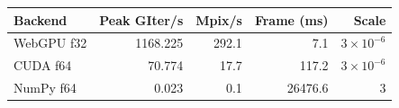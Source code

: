 \begin{tabular}{@{}lrrrr@{}}
\toprule
Backend & Peak GIter/s & Mpix/s & Frame (ms) & Scale \\
\midrule
WebGPU f32 & 1168.225 & 292.1 & 7.1 & $3{\times}10^{-6}$ \\
CUDA f64 & 70.774 & 17.7 & 117.2 & $3{\times}10^{-6}$ \\
NumPy f64 & 0.023 & 0.1 & 26476.6 & $3$ \\
\bottomrule
\end{tabular}
